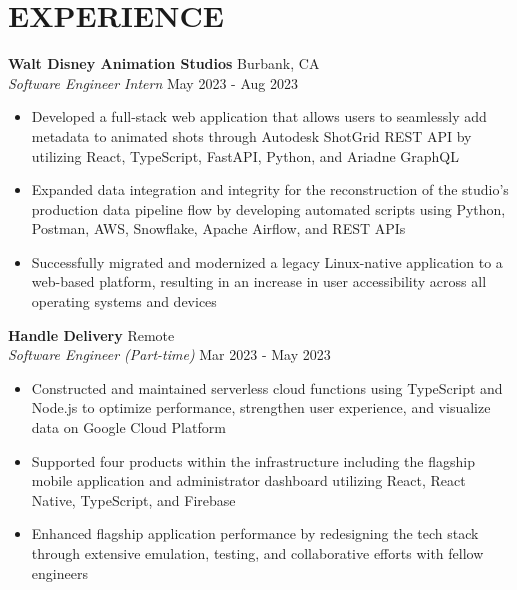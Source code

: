 \documentclass[a4paper,10pt]{extarticle}
\begin{document}
\section*{EXPERIENCE}
\noindent
\textbf{Walt Disney Animation Studios} \hfill Burbank, CA \\ %
\textit{Software Engineer Intern} \hfill May 2023 - Aug 2023 %
\begin{itemize}
    \item Developed a full-stack web application that allows users to seamlessly add metadata to animated shots through Autodesk ShotGrid REST API by utilizing React, TypeScript, FastAPI, Python, and Ariadne GraphQL
    \item Expanded data integration and integrity for the reconstruction of the studio’s production data pipeline flow by developing automated scripts using Python, Postman, AWS, Snowflake, Apache Airflow, and REST APIs
    \item Successfully migrated and modernized a legacy Linux-native application to a web-based platform, resulting in an increase in user accessibility across all operating systems and devices %
\end{itemize}

\noindent
\textbf{Handle Delivery} \hfill Remote\\ %
\textit{Software Engineer (Part-time)} \hfill Mar 2023 - May 2023 %
\begin{itemize}
    \item Constructed and maintained serverless cloud functions using TypeScript and Node.js to optimize performance, strengthen user experience, and visualize data on Google Cloud Platform
    \item Supported four products within the infrastructure including the flagship mobile application and administrator dashboard utilizing React, React Native, TypeScript, and Firebase
    \item Enhanced flagship application performance by redesigning the tech stack through extensive emulation, testing, and collaborative efforts with fellow engineers %
\end{itemize}
\end{document}
